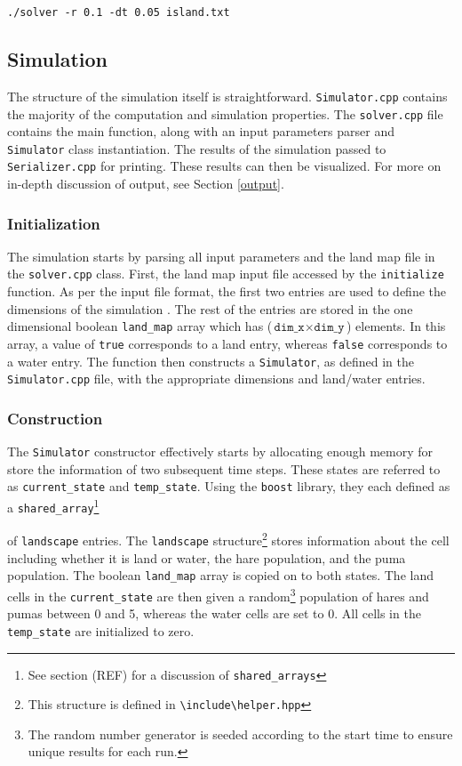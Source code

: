 \documentclass[a4paper,11pt]{article}
\begin{document}
{\vspace{5pt}
\noindent\texttt{./solver -r 0.1 -dt 0.05 island.txt}

\subsection{Simulation}

The structure of the simulation itself is straightforward.  \texttt{Simulator.cpp} contains the majority of the computation and simulation properties.  The \texttt{solver.cpp} file contains the main function, along with an input parameters parser and \texttt{Simulator} class instantiation.  The results of the simulation passed to \texttt{Serializer.cpp} for printing.  These results can then be visualized.  For more on in-depth discussion of output, see Section \ref{output}.

\subsubsection{Initialization}

The simulation starts by parsing all input parameters and the land map file in the \texttt{solver.cpp} class.  First, the land map input file accessed by the \texttt{initialize} function.  As per the input file format, the first two entries are used to define the dimensions of the simulation .  The rest of the entries are stored in the one dimensional boolean \texttt{land\_map} array which has ($\texttt{dim\_x} \times \texttt{dim\_y}$) elements.  In this array, a value of \texttt{true} corresponds to a land entry, whereas \texttt{false} corresponds to a water entry.  The function then constructs a \texttt{Simulator}, as defined in the \texttt{Simulator.cpp} file, with the appropriate dimensions and land/water entries.  

\subsubsection{Construction}

The \texttt{Simulator} constructor effectively starts by allocating enough memory for store the information of two subsequent time steps.  These states are  referred to as \texttt{current\_state} and \texttt{temp\_state}.  Using the \texttt{boost} library, they each defined as a \texttt{shared\_array}\footnote{See section (REF) for a discussion of \texttt{shared\_arrays}}} of \texttt{landscape} entries.  The \texttt{landscape} structure\footnote{This structure is defined in \texttt{\textbackslash include\textbackslash helper.hpp}} stores information about the cell including whether it is land or water, the hare population, and the puma population. The boolean \texttt{land\_map} array is copied on to both states.  The land cells in the \texttt{current\_state} are then given a random\footnote{The random number generator is seeded according to the start time to ensure unique results for each run.} population of hares and pumas between 0 and 5, whereas the water cells are set to 0.  All cells in the \texttt{temp\_state} are initialized to zero.
\end{document}
